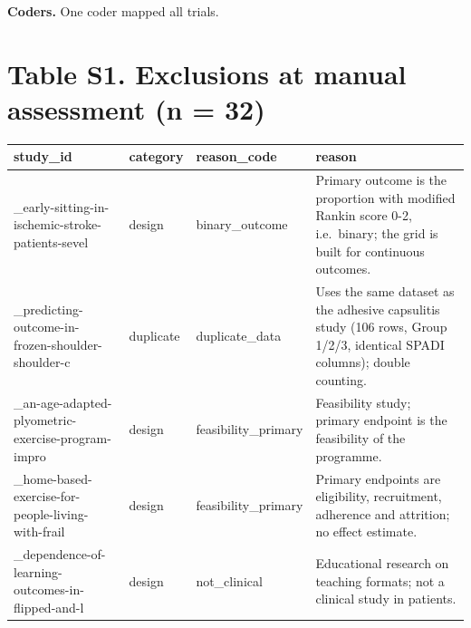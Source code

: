 \textbf{Coders.} One coder mapped all trials.

\section{Table S1. Exclusions at manual assessment (n = 32)}\label{table-s1.-exclusions-at-manual-assessment-n-32}

{
\begin{longtable}[]{@{}
  >{\raggedright\arraybackslash}p{}
  >{\raggedright\arraybackslash}p{}
  >{\raggedright\arraybackslash}p{}
  >{\raggedright\arraybackslash}p{}@{}}
\toprule\noalign{}
\begin{minipage}[b]{\linewidth}\raggedright
study\_id
\end{minipage} & \begin{minipage}[b]{\linewidth}\raggedright
category
\end{minipage} & \begin{minipage}[b]{\linewidth}\raggedright
reason\_code
\end{minipage} & \begin{minipage}[b]{\linewidth}\raggedright
reason
\end{minipage} \\
\midrule\noalign{}
\endhead
\bottomrule\noalign{}
\endlastfoot
2016\_early-sitting-in-ischemic-stroke-patients-sevel & design & binary\_outcome & Primary outcome is the proportion with modified Rankin score 0-2, i.e.~binary; the grid is built for continuous outcomes. \\
2017\_predicting-outcome-in-frozen-shoulder-shoulder-c & duplicate & duplicate\_data & Uses the same dataset as the adhesive capsulitis study (106 rows, Group 1/2/3, identical SPADI columns); double counting. \\
2020\_an-age-adapted-plyometric-exercise-program-impro & design & feasibility\_primary & Feasibility study; primary endpoint is the feasibility of the programme. \\
2021\_home-based-exercise-for-people-living-with-frail & design & feasibility\_primary & Primary endpoints are eligibility, recruitment, adherence and attrition; no effect estimate. \\
2022\_dependence-of-learning-outcomes-in-flipped-and-l & design & not\_clinical & Educational research on teaching formats; not a clinical study in patients. \\

\end{longtable}}
